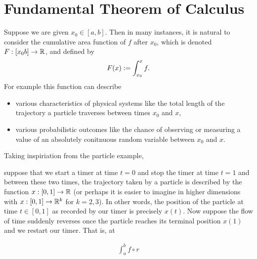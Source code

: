 \documentclass{book}
\begin{document}
	
	
	
	
	
	
	
	
	
	
	
	
	
	
	
	
	
	
	
	
	
	
	
	
	
	
	
	
	
	
	
	
	
	
	
	
	\section{Fundamental Theorem of Calculus}
	
	Suppose we are given $x_0 \in [a,b]$. Then in many instances, it is natural to consider the cumulative area function of $f$ after $x_0$, which is denoted $F:[x_0 b] \rightarrow \mathbb{R}$, and defined by $$F(x) \vcentcolon= \int_{x_0}^x f.$$  
	For example this function can describe  
	\begin{itemize}
		\item various characteristics of physical systems like the total length of the trajectory a particle traverses between times $x_0$ and $x$, 
		\item various probabilistic outcomes like the chance of observing or measuring a value of an absolutely conitnuous random variable between $x_0$ and $x$.
	\end{itemize}
	Taking inspiriation from the particle example, 
	
	suppose that we start a timer at time $t =0$ and stop the timer at time $t=1$ and between these two times, the trajectory taken by a particle is described by the function $x:[0,1] \rightarrow \mathbb{R}$ (or perhaps it is easier to imagine in higher dimensions with $x:[0,1] \rightarrow \mathbb{R}^k$ for $k=2,3$). In other words, the position of the particle at time $t \in [0,1]$ as recorded by our timer is precisely $x(t)$. Now suppose the flow of time suddenly reverses once the particle reaches its terminal position $x(1)$ and we restart our timer. That is, at 
	
	\begin{align*}
		\int_a^b f \circ r 
	\end{align*}
	
\end{document}

